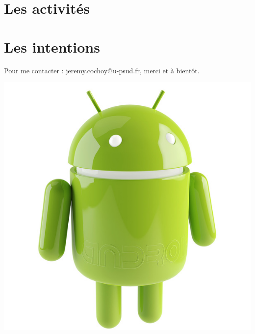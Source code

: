 \documentclass{beamer}
\begin{document}
\section{Les activités}

\section{Les intentions}

\begin{frame}
\begin{center}
Pour me contacter : jeremy.cochoy@u-psud.fr, merci et à bientôt.

\includegraphics[scale=0.18]{android.jpg}
\end{center}
\end{frame}
\end{document}
